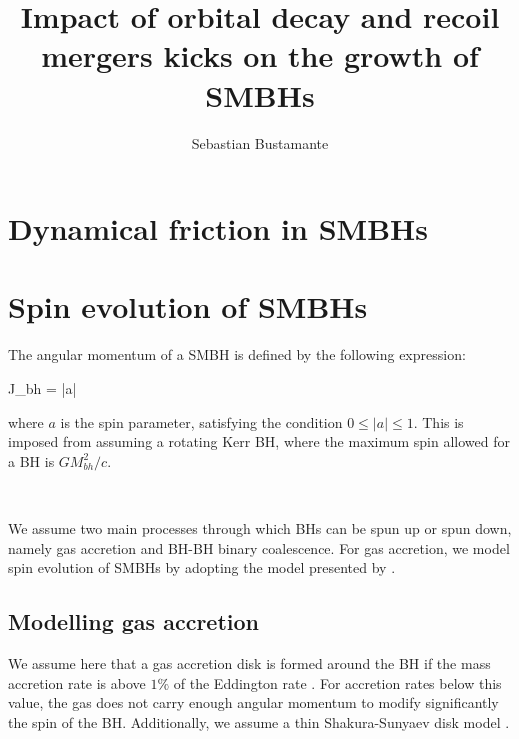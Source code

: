 \documentclass[a4,useAMS,usenatbib,usegraphicx,12pt]{article}
\title{Impact of orbital decay and recoil mergers kicks on the growth of SMBHs}
\author{Sebastian Bustamante}
\date{}
\begin{document}
\maketitle
\tableofcontents
 
\newpage 

\section{Dynamical friction in SMBHs}



\section{Spin evolution of SMBHs}

The angular momentum of a SMBH is defined by the following expression:

{ J_{bh} = |a| }

where $a$ is the spin parameter, satisfying the condition $0\leq |a| \leq 1$. This is imposed from
assuming a rotating Kerr BH, where the maximum spin allowed for a BH is $GM_{bh}^2/c$.

\

We assume two main processes through which BHs can be spun up or spun down, namely gas accretion and 
BH-BH binary coalescence. For gas accretion, we model spin evolution of SMBHs by adopting the model 
presented by \citet{Fanidakis2011}.

\subsection{Modelling gas accretion}

We assume here that a gas accretion disk is formed around the BH if the mass accretion rate is above 
$1\%$ of the Eddington rate \citep{Fanidakis2011}. For accretion rates below this value, the gas does 
not carry enough angular momentum to modify significantly the spin of the BH. Additionally, we assume
a thin Shakura-Sunyaev disk model \citep{Shakura1973}.
\end{document}
